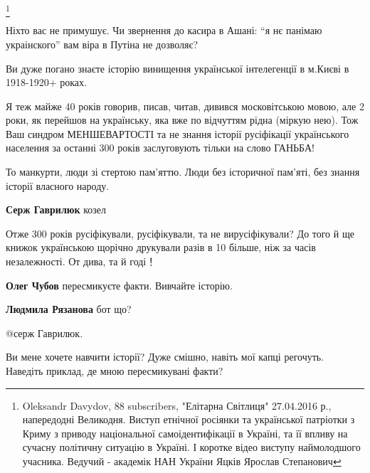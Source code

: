 \begin{itemize}
\footnote{
Oleksandr Davydov, 88 subscribers,
"Елітарна Світлиця" 27.04.2016 р., напередодні Великодня. Виступ етнічної
росіянки та української патріотки з Криму з приводу національної
самоідентифікації в Україні, та її впливу на сучасну політичну ситуацію в
Україні. І коротке відео виступу наймолодшого учасника. Ведучий - академік НАН
України Яцків Ярослав Степанович
}


Ніхто вас не примушує.
Чи звернення до касира в Ашані: \enquote{я нє панімаю украінского} вам віра в Путіна не дозволяє?




Ви дуже погано знаєте історію винищення української інтелегенції в м.Києві в 1918-1920+ роках.

Я теж майже 40 років говорив, писав, читав, дивився московітською мовою, але 2
роки, як перейшов на українську, яка вже по відчуттям рідна (міркую нею). Тож
Ваш синдром МЕНШЕВАРТОСТІ та не знання історії русіфікації українського
населення за останні 300 років заслуговують тільки на слово ГАНЬБА!

\begin{itemize}
То манкурти, люди зі стертою пам'яттю. Люди без історичної пам'яті, без знання історії власного народу.

\textbf{Серж Гаврилюк} козел

Отже 300 років русіфікували, русіфікували, та не вирусіфікували? До того й ще
книжок українською щорічно друкували разів в 10 більше, ніж за часів
незалежності. От дива, та й годі！

\textbf{Олег Чубов} пересмикуєте факти. Вивчайте історію.

\textbf{Людмила Рязанова} бот що?

@серж Гаврилюк.

Ви мене хочете навчити історії? Дуже смішно, навіть мої капці регочуть.
Наведіть приклад, де мною пересмикувані факти?


\end{itemize}
\end{itemize}
